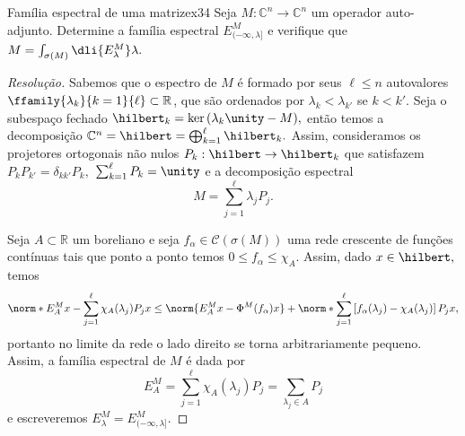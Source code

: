 \begin{exercício}{Família espectral de uma matriz}{ex34}
  Seja \(M : \mathbb{C}^n \to \mathbb{C}^n\) um operador auto-adjunto. Determine a família espectral \(E^M_{(-\infty, \lambda]}\) e verifique que \(M = \int_{\sigma(M)} \dli{E_\lambda^M}\lambda.\)
\end{exercício}
\begin{proof}[Resolução]
  Sabemos que o espectro de \(M\) é formado por seus \(\ell \leq n\) autovalores \(\ffamily{\lambda_k}{k = 1}{\ell}\subset\mathbb{R}\), que são ordenados por \(\lambda_k < \lambda_{k'}\) se \(k < k'\). Seja o subespaço fechado \(\hilbert_k = \ker{(\lambda_k\unity - M)},\) então temos a decomposição \(\mathbb{C}^n = \hilbert = \bigoplus_{k = 1}^\ell \hilbert_k.\) Assim, consideramos os projetores ortogonais não nulos \(P_k : \hilbert \to \hilbert_k\) que satisfazem \(P_{k} P_{k'} = \delta_{kk'}P_k,\) \(\sum_{k = 1}^\ell P_k = \unity\) e a decomposição espectral
  \begin{equation*}
    M = \sum_{j = 1}^\ell \lambda_j P_j.
  \end{equation*}

  Seja \(A \subset \mathbb{R}\) um boreliano e seja \(f_\alpha \in \mathcal{C}(\sigma(M))\) uma rede crescente de funções contínuas tais que ponto a ponto temos \(0 \leq f_\alpha \leq \chi_A.\) Assim, dado \(x \in \hilbert,\) temos
  \begin{equation*}
    \norm*{E^M_Ax - \sum_{j = 1}^\ell{\chi_A(\lambda_j)P_jx}} \leq \norm{E^M_Ax - \Phi^M(f_\alpha)x} + \norm*{\sum_{j = 1}^\ell{\left[f_\alpha(\lambda_j) - \chi_A(\lambda_j)\right]P_jx}},
  \end{equation*}
  portanto no limite da rede o lado direito se torna arbitrariamente pequeno. Assim, a família espectral de \(M\) é dada por
  \begin{equation*}
    E^M_A = \sum_{j = 1}^\ell{\chi_A(\lambda_j)P_j} = \sum_{\lambda_j \in A}{P_j}
  \end{equation*}
  e escreveremos \(E_\lambda^M = E^M_{(-\infty,\lambda]}.\)


\end{proof}
